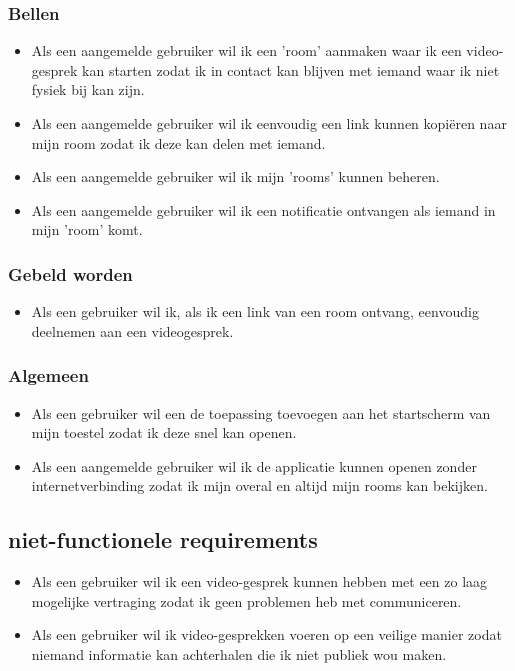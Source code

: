	 \subsubsection{Bellen}
		  \begin{itemize}
		   	\item Als een aangemelde gebruiker wil ik een 'room' aanmaken waar ik een video-gesprek kan starten zodat ik in contact kan blijven met iemand waar ik niet fysiek bij kan zijn.
		   	\item Als een aangemelde gebruiker wil ik eenvoudig een link kunnen kopiëren naar mijn room zodat ik deze kan delen met iemand.
		   	\item Als een aangemelde gebruiker wil ik mijn 'rooms' kunnen beheren.
		   	\item Als een aangemelde gebruiker wil ik een notificatie ontvangen als iemand in mijn 'room' komt.
		  \end{itemize}
 	
 	\subsubsection{Gebeld worden}
 	 \begin{itemize}
			\item Als een gebruiker wil ik, als ik een link van een room ontvang, eenvoudig deelnemen aan een videogesprek.
 	 \end{itemize}

	\subsubsection{Algemeen}
 		\begin{itemize}
 			\item Als een gebruiker wil een de toepassing toevoegen aan het startscherm van mijn toestel zodat ik deze snel kan openen.
 			\item Als een aangemelde gebruiker wil ik de applicatie kunnen openen zonder internetverbinding zodat ik mijn overal en altijd mijn rooms kan bekijken.
		  
		\end{itemize}
 
	\subsection{niet-functionele requirements}
		\begin{itemize}
			\item Als een gebruiker wil ik een video-gesprek kunnen hebben met een zo laag mogelijke vertraging zodat ik geen problemen heb met communiceren.
			\item Als een gebruiker wil ik video-gesprekken voeren op een veilige manier zodat niemand informatie kan achterhalen die ik niet publiek wou maken.
		\end{itemize} 

 